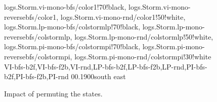 \begin{figure*}[t]
	\centering
	{
logs.Storm.vi-mono-bfs/color1!70!black,
logs.Storm.vi-mono-reversebfs/color1,
logs.Storm.vi-mono-rnd/color1!50!white,
logs.Storm.lp-mono-bfs/colstormlp!70!black,
logs.Storm.lp-mono-reversebfs/colstormlp,
logs.Storm.lp-mono-rnd/colstormlp!50!white,
logs.Storm.pi-mono-bfs/colstormpi!70!black,
logs.Storm.pi-mono-reversebfs/colstormpi,
logs.Storm.pi-mono-rnd/colstormpi!30!white
	}
	{VI-bfs-b2f,VI-bfs-f2b,VI-rnd,LP-bfs-b2f,LP-bfs-f2b,LP-rnd,PI-bfs-b2f,PI-bfs-f2b,PI-rnd}
	{0}{\numcommunity}{0.1}{900}{south east}
%


	\caption{Impact of permuting the states.}
	\label{fig:state-ordering}
\end{figure*}